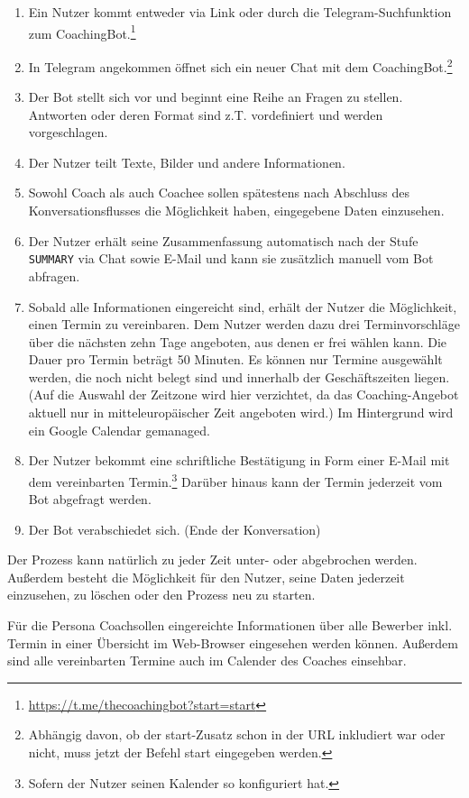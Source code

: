 	\begin{enumerate}
		\item Ein Nutzer kommt entweder via Link oder durch die Telegram-Suchfunktion zum CoachingBot.\footnote{\url{https://t.me/thecoachingbot?start=start}}
		\item In Telegram angekommen öffnet sich ein neuer Chat mit dem CoachingBot.\footnote{Abhängig davon, ob der start-Zusatz schon in der URL inkludiert war oder nicht, muss jetzt der Befehl \/start eingegeben werden.}
		\item Der Bot stellt sich vor und beginnt eine Reihe an Fragen zu stellen. Antworten oder deren Format sind z.T. vordefiniert und werden vorgeschlagen.
		\item Der Nutzer teilt Texte, Bilder und andere Informationen.
        \item Sowohl Coach als auch Coachee sollen spätestens nach Abschluss des Konversationsflusses die Möglichkeit haben, eingegebene Daten einzusehen.
        \item Der Nutzer erhält seine Zusammenfassung automatisch nach der Stufe \verb|SUMMARY| via Chat sowie E-Mail und kann sie zusätzlich manuell vom Bot abfragen.
        \item Sobald alle Informationen eingereicht sind, erhält der Nutzer die Möglichkeit, einen Termin zu vereinbaren. Dem Nutzer werden dazu drei Terminvorschläge über die nächsten zehn Tage angeboten, aus denen er frei wählen kann. Die Dauer pro Termin beträgt 50 Minuten. Es können nur Termine ausgewählt werden, die noch nicht belegt sind und innerhalb der Geschäftszeiten liegen. (Auf die Auswahl der Zeitzone wird hier verzichtet, da das Coaching-Angebot aktuell nur in mitteleuropäischer Zeit angeboten wird.) Im Hintergrund wird ein Google Calendar gemanaged.
        \item Der Nutzer bekommt eine schriftliche Bestätigung in Form einer E-Mail mit dem vereinbarten Termin.\footnote{Sofern der Nutzer seinen Kalender so konfiguriert hat.} Darüber hinaus kann der Termin jederzeit vom Bot abgefragt werden.
        \item Der Bot verabschiedet sich. (Ende der Konversation)

    \end{enumerate}
	Der Prozess kann natürlich zu jeder Zeit unter- oder abgebrochen werden. Außerdem besteht die Möglichkeit für den Nutzer, seine Daten jederzeit einzusehen, zu löschen oder den Prozess neu zu starten.

	Für die Persona \glqq Coach\grqq  sollen eingereichte Informationen über alle Bewerber inkl. Termin in einer Übersicht im Web-Browser eingesehen werden können. Außerdem sind alle vereinbarten Termine auch im Calender des Coaches einsehbar.

